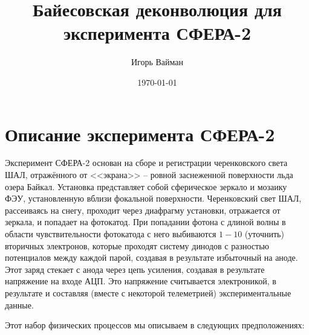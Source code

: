 \documentclass[12pt]{book}
\title{Байесовская деконволюция для эксперимента СФЕРА-2}
\author{Игорь Вайман}
\date{\today}
\begin{document}
	\maketitle
	
	\chapter{Описание эксперимента СФЕРА-2}

	Эксперимент СФЕРА-2 основан на сборе и регистрации черенковского света ШАЛ, отражённого от <<экрана>> -- ровной заснеженной поверхности льда озера Байкал. Установка представляет собой сферическое зеркало и мозаику ФЭУ, установленную вблизи фокальной поверхности. Черенковский свет ШАЛ, рассеиваясь на снегу, проходит через диафрагму установки, отражается от зеркала, и попадает на фотокатод. При попадании фотона с длиной волны в области чувствительности фотокатода с него выбиваются $1 - 10$ (уточнить) вторичных электронов, которые проходят систему динодов с разностью потенциалов между каждой парой, создавая в результате избыточный на аноде. Этот заряд стекает с анода через цепь усиления, создавая в результате напряжение на входе АЦП. Это напряжение считывается электроникой, в результате и составляя (вместе с некоторой телеметрией) экспериментальные данные.
	
	Этот набор физических процессов мы описываем в следующих предположениях:
	
\end{document}
